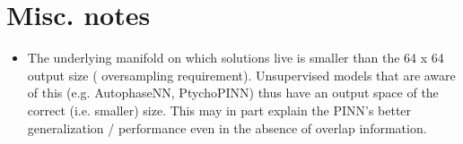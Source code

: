 \documentclass[sn-mathphys]{sn-jnl}%
\theoremstyle{thmstyleone}%
\theoremstyle{thmstyletwo}%
\theoremstyle{thmstylethree}%
\begin{document}
\section{Misc. notes}
\begin{itemize}

\item The underlying manifold on which solutions live is smaller than the 64 x 64 output size ( oversampling requirement). Unsupervised models that are aware of this (e.g. AutophaseNN, PtychoPINN) thus have an output space of the correct (i.e. smaller) size. This may in part explain the PINN's better generalization / performance even in the absence of overlap information.
\end{itemize}
%

\end{document}
